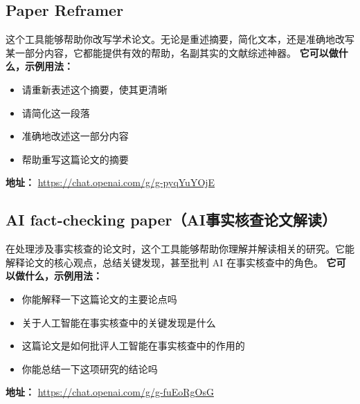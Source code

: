 \subsection{Paper Reframer}
这个工具能够帮助你改写学术论文。无论是重述摘要，简化文本，还是准确地改写某一部分内容，它都能提供有效的帮助，名副其实的文献综述神器。
\textbf{它可以做什么，示例用法：}
\begin{itemize}
    \item 请重新表述这个摘要，使其更清晰
    \item 请简化这一段落
    \item 准确地改述这一部分内容
    \item 帮助重写这篇论文的摘要
\end{itemize}
\textbf{地址：} \url{https://chat.openai.com/g/g-pyqYuYOjE}

\subsection{AI fact-checking paper（AI事实核查论文解读）}
在处理涉及事实核查的论文时，这个工具能够帮助你理解并解读相关的研究。它能解释论文的核心观点，总结关键发现，甚至批判 AI 在事实核查中的角色。
\textbf{它可以做什么，示例用法：}
\begin{itemize}
    \item 你能解释一下这篇论文的主要论点吗
    \item 关于人工智能在事实核查中的关键发现是什么
    \item 这篇论文是如何批评人工智能在事实核查中的作用的
    \item 你能总结一下这项研究的结论吗
\end{itemize}
\textbf{地址：} \url{https://chat.openai.com/g/g-fuEoRgOsG}

